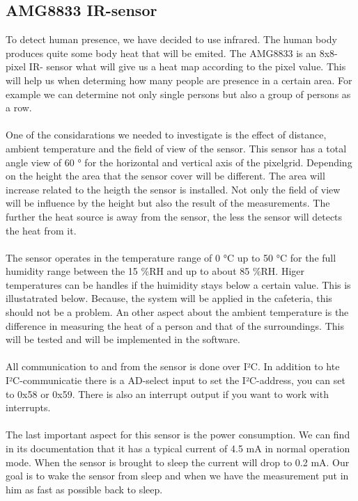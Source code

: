 \documentclass[11pt,a4paper]{article}
\begin{document}
\subsection{AMG8833 IR-sensor}
To detect human presence, we have decided to use infrared. The human body produces quite some body heat that will be emited. The AMG8833  is an 8x8-pixel IR- sensor what will give us a heat map according to the pixel value. This will help us when determing how many people are presence in a certain area. For example we can determine not only single persons but also a group of persons as a row. 
\\ \\
One of the considarations we needed to investigate is the effect of distance, ambient temperature and the field of view of the sensor. This sensor has a total angle view of 60 ° for the horizontal and vertical axis of the pixelgrid. Depending on the height the area that the sensor cover will be different. The area will increase related to the heigth the sensor is installed. Not only the field of view will be influence by the height but also the result of the measurements. The further the heat source is away from the sensor, the less the sensor will detects the heat from it. 
\\ \\
The sensor operates in the temperature range of 0 °C up to 50 °C for the full humidity range between the 15 \%RH and up to about 85 \%RH. Higer temperatures can be handles if the huimidity stays below a certain value. This is illustatrated below. Because, the system will be applied in the cafeteria, this should not be a problem. An other aspect about the ambient temperature is the difference in measuring the heat of a person and that of the surroundings. This will be tested and will be implemented in the software. 
\\ \\
All communication to and from the sensor is done over I²C. In addition to hte I²C-communicatie there is a AD-select input to set the I²C-address, you can set to 0x58 or 0x59. There is also an interrupt output if you want to work with interrupts.
\\ \\
The last important aspect for this sensor is the power consumption. We can find in its documentation that it has a typical current of 4.5 mA in normal operation mode. When the sensor is brought to sleep the current will drop to 0.2 mA. Our goal is to wake the sensor from sleep and when we have the measurement put in him as fast as possible back to sleep.
\end{document}
